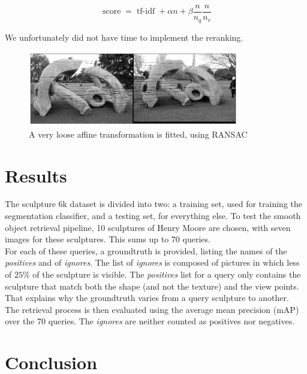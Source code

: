 \documentclass{article}
\DeclareMathOperator{\score}{score}
\DeclareMathOperator{\tfidf}{tf-idf}
\begin{document}
\begin{equation*}
\score = \tfidf + \alpha n + \beta \frac{n}{n_q} \frac{n}{n_r}
\end{equation*}

We unfortunately did not have time to implement the reranking.

\begin{figure}
\label{ransac}
\begin{center}
\includegraphics[width=350px]{images/matching_01.png}
\end{center}
\caption{A very loose affine transformation is fitted, using RANSAC}
\end{figure}

\section{Results}

The sculpture 6k dataset is divided into two: a training set, used for
training the segmentation classifier, and a testing set, for everything else.
To test the smooth object retrieval pipeline, 10 sculptures of Henry Moore are
chosen, with seven images for these sculptures. This sums up to 70 queries. \\
For each of these queries, a groundtruth is provided, listing the names of the
\textit{positives} and of \textit{ignores}. The list of \textit{ignores} is
composed of pictures in which less of $25$\% of the sculpture is visible. The
\textit{positives} list for a query only contains the sculpture that match
both the shape (and not the texture) and the view points. That explains why
the groundtruth varies from a query sculpture to another. \\
The retrieval process is then evaluated using the average mean precision (mAP)
over the 70 queries. The \textit{ignores} are neither counted as positives nor
negatives.

\section{Conclusion}



\end{document}
